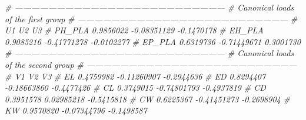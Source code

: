 \documentclass[
]{book}
\newenvironment{Shaded}{\begin{snugshade}}{\end{snugshade}}
\newcommand{\CommentTok}[1]{\textcolor[rgb]{0.56,0.35,0.01}{\textit{#1}}}
\begin{document}
\begin{Shaded}
\begin{Highlighting}[]
\CommentTok{# ---------------------------------------------------------------------------}
\CommentTok{# Canonical loads of the first group }
\CommentTok{# ---------------------------------------------------------------------------}
\CommentTok{#               U1          U2         U3}
\CommentTok{# PH_PLA 0.9856022 -0.08351129 -0.1470178}
\CommentTok{# EH_PLA 0.9085216 -0.41771278 -0.0102277}
\CommentTok{# EP_PLA 0.6319736 -0.71449671  0.3001730}
\CommentTok{# ---------------------------------------------------------------------------}
\CommentTok{# Canonical loads of the second group }
\CommentTok{# ---------------------------------------------------------------------------}
\CommentTok{#           V1          V2         V3}
\CommentTok{# EL 0.4759982 -0.11260907 -0.2944636}
\CommentTok{# ED 0.8294407 -0.18663860 -0.4477426}
\CommentTok{# CL 0.3749015 -0.74801793 -0.4937819}
\CommentTok{# CD 0.3951578  0.02985218 -0.5415818}
\CommentTok{# CW 0.6225367 -0.41451273 -0.2698904}
\CommentTok{# KW 0.9570820 -0.07344796 -0.1498587}


\end{Highlighting}
\end{Shaded}
\end{document}
